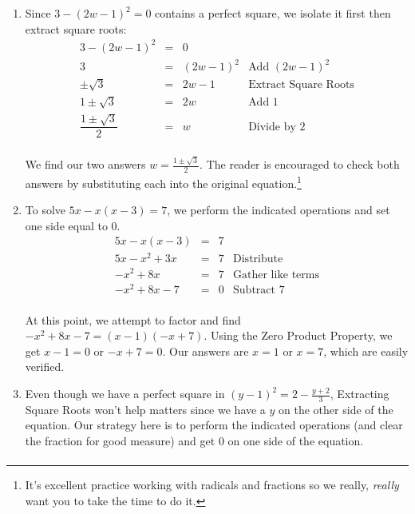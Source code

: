 \documentclass{ximera}
\begin{document}
{{{{{\begin{example}
\begin{enumerate}

\item  Since $3 - (2w-1)^2 = 0$ contains a perfect square, we isolate it first then extract square roots: \[ \begin{array}{rclr}

3 - (2w-1)^2 & = & 0 & \\

3 & = & (2w-1)^2 & \text{Add $(2w-1)^2$} \\

\pm \sqrt{3} & = & 2w - 1 & \text{Extract Square Roots} \\

1 \pm \sqrt{3} & = & 2w & \text{Add $1$} \\

\dfrac{1 \pm \sqrt{3}}{2} & = & w & \text{Divide by $2$} \\

\end{array} \]

We find our two answers $w = \frac{1 \pm \sqrt{3}}{2}$.  The reader is encouraged to check both answers by substituting each into the original equation.\footnote{It's excellent  practice working with radicals and fractions so we really, \emph{really} want you to take the time to do it.}

\item To solve $5x - x(x-3) = 7$, we perform the indicated operations and set one side equal to $0$.\[ \begin{array}{rclr}

5x - x(x-3) & = & 7 & \\

5x - x^2 + 3x & = & 7 & \text{Distribute} \\

-x^2 + 8x & = & 7 & \text{Gather like terms} \\

-x^2 + 8x - 7 & = & 0& \text{Subtract $7$} \\

\end{array}\]

At this point, we attempt to factor and find $-x^2 + 8x - 7 = (x-1)(-x+7)$.  Using the Zero Product Property, we get $x-1 = 0$  or $-x+7 = 0$.  Our answers are $x = 1$ or $x = 7$, which are easily verified.

\item Even though we have a perfect square in $(y-1)^2 = 2 - \frac{y+2}{3}$, Extracting Square Roots won't help matters since we have a $y$ on the other side of the equation.  Our strategy here is to perform the indicated operations (and clear the fraction for good measure) and get $0$ on one side of the equation.\[ \begin{array}{rclr}


\end{array}\]
\end{enumerate}
\end{example}}}}}}
\end{document}
